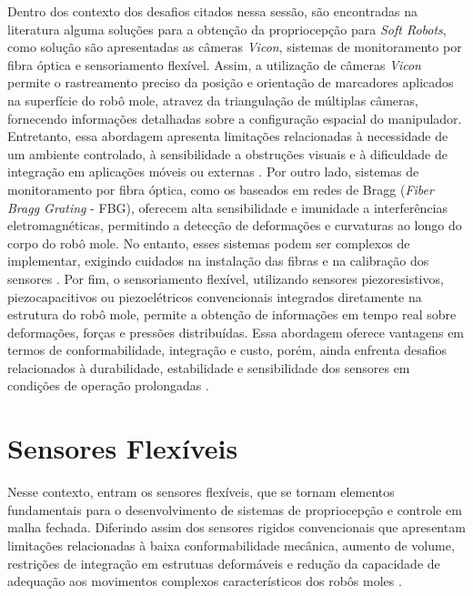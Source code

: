 Dentro dos contexto dos desafios citados nessa sessão, são encontradas na literatura alguma soluções para a obtenção da propriocepção para \textit{Soft Robots},
como solução são apresentadas as câmeras \textit{Vicon}, sistemas de monitoramento por fibra óptica e sensoriamento flexível. Assim, a utilização de câmeras \textit{Vicon} 
permite o rastreamento preciso da posição e orientação de marcadores aplicados na superfície do robô mole, atravez da triangulação de múltiplas câmeras, fornecendo 
informações detalhadas sobre a configuração espacial do manipulador. Entretanto, essa abordagem apresenta limitações relacionadas à necessidade de um ambiente controlado, 
à sensibilidade a obstruções visuais e à dificuldade de integração em aplicações móveis ou externas \cite{Zhou2024}. Por outro lado, sistemas de monitoramento por fibra 
óptica, como os baseados em redes de Bragg (\textit{Fiber Bragg Grating} - FBG), oferecem alta sensibilidade e imunidade a interferências eletromagnéticas, permitindo a 
detecção de deformações e curvaturas ao longo do corpo do robô mole. No entanto, esses sistemas podem ser complexos de implementar, exigindo cuidados na instalação das 
fibras e na calibração dos sensores \cite{Zhou2024}. Por fim, o sensoriamento flexível, utilizando sensores piezoresistivos, piezocapacitivos ou piezoelétricos convencionais integrados 
diretamente na estrutura do robô mole, permite a obtenção de informações em tempo real sobre deformações, forças e pressões distribuídas. Essa abordagem oferece vantagens 
em termos de conformabilidade, integração e custo, porém, ainda enfrenta desafios relacionados à durabilidade, estabilidade e sensibilidade dos sensores em condições de 
operação prolongadas \cite{Zhou2024}.

\section{Sensores Flexíveis}

Nesse contexto, entram os sensores flexíveis, que se tornam elementos fundamentais para o desenvolvimento de sistemas de propriocepção e controle
em malha fechada. Diferindo assim dos sensores rigidos convencionais que apresentam limitações relacionadas à baixa conformabilidade mecânica,
aumento de volume, restrições de integração em estrutuas deformáveis e redução da capacidade de adequação aos movimentos complexos característicos
dos robôs moles \cite{WOS:001403456400001}.

